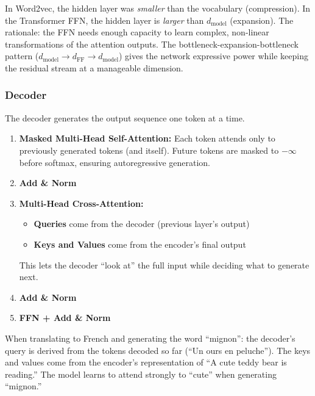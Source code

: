 \documentclass[11pt, a4paper]{article}
\begin{document}
\begin{notebox}
In Word2vec, the hidden layer was \emph{smaller} than the vocabulary (compression). In the Transformer FFN, the hidden layer is \emph{larger} than $d_{\text{model}}$ (expansion). The rationale: the FFN needs enough capacity to learn complex, non-linear transformations of the attention outputs. The bottleneck-expansion-bottleneck pattern ($d_{\text{model}} \to d_{\text{FF}} \to d_{\text{model}}$) gives the network expressive power while keeping the residual stream at a manageable dimension.
\end{notebox}

\subsubsection{Decoder}

The decoder generates the output sequence one token at a time.

\begin{notebox}
\begin{enumerate}[leftmargin=1.5em]
  \item \textbf{Masked Multi-Head Self-Attention:} Each token attends only to previously generated tokens (and itself). Future tokens are masked to $-\infty$ before softmax, ensuring autoregressive generation.
  \item \textbf{Add \& Norm}
  \item \textbf{Multi-Head Cross-Attention:}
    \begin{itemize}
      \item \textbf{Queries} come from the decoder (previous layer's output)
      \item \textbf{Keys and Values} come from the encoder's final output
    \end{itemize}
    This lets the decoder ``look at'' the full input while deciding what to generate next.
  \item \textbf{Add \& Norm}
  \item \textbf{FFN + Add \& Norm}
\end{enumerate}
\end{notebox}

\begin{exbox}
When translating to French and generating the word ``mignon'': the decoder's query is derived from the tokens decoded so far (``Un ours en peluche''). The keys and values come from the encoder's representation of ``A cute teddy bear is reading.'' The model learns to attend strongly to ``cute'' when generating ``mignon.''
\end{exbox}
\end{document}
